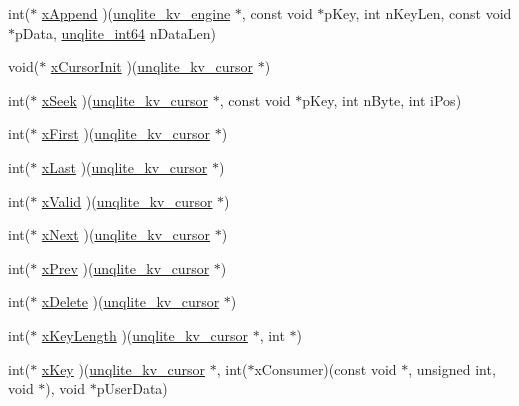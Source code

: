 \begin{DoxyCompactItemize}
\item 
int($\ast$ \hyperlink{structunqlite__kv__methods_a84b482400e3dee633d777cca654b6aec}{x\-Append} )(\hyperlink{structunqlite__kv__engine}{unqlite\-\_\-kv\-\_\-engine} $\ast$, const void $\ast$p\-Key, int n\-Key\-Len, const void $\ast$p\-Data, \hyperlink{unqlite_8c_ae7dd2792142c2ec7874a56602b8f2bb8}{unqlite\-\_\-int64} n\-Data\-Len)
\item 
void($\ast$ \hyperlink{structunqlite__kv__methods_a89a88a0ec7164b2529d282a8ae1bbd21}{x\-Cursor\-Init} )(\hyperlink{structunqlite__kv__cursor}{unqlite\-\_\-kv\-\_\-cursor} $\ast$)
\item 
int($\ast$ \hyperlink{structunqlite__kv__methods_a56a566a04004c87f270a12b316deb087}{x\-Seek} )(\hyperlink{structunqlite__kv__cursor}{unqlite\-\_\-kv\-\_\-cursor} $\ast$, const void $\ast$p\-Key, int n\-Byte, int i\-Pos)
\item 
int($\ast$ \hyperlink{structunqlite__kv__methods_a18e040ebb42c50ced03d545d48b98c72}{x\-First} )(\hyperlink{structunqlite__kv__cursor}{unqlite\-\_\-kv\-\_\-cursor} $\ast$)
\item 
int($\ast$ \hyperlink{structunqlite__kv__methods_a4cf12f1965c2442575cb226397c3545c}{x\-Last} )(\hyperlink{structunqlite__kv__cursor}{unqlite\-\_\-kv\-\_\-cursor} $\ast$)
\item 
int($\ast$ \hyperlink{structunqlite__kv__methods_a766810f47c6450157b01398f0d76f910}{x\-Valid} )(\hyperlink{structunqlite__kv__cursor}{unqlite\-\_\-kv\-\_\-cursor} $\ast$)
\item 
int($\ast$ \hyperlink{structunqlite__kv__methods_ae177efc5e24a54891754ef2994786228}{x\-Next} )(\hyperlink{structunqlite__kv__cursor}{unqlite\-\_\-kv\-\_\-cursor} $\ast$)
\item 
int($\ast$ \hyperlink{structunqlite__kv__methods_ae16eea9a25dc889523a9a0729cb86def}{x\-Prev} )(\hyperlink{structunqlite__kv__cursor}{unqlite\-\_\-kv\-\_\-cursor} $\ast$)
\item 
int($\ast$ \hyperlink{structunqlite__kv__methods_a83aa7b58b08550a4814b4184eddb8d3c}{x\-Delete} )(\hyperlink{structunqlite__kv__cursor}{unqlite\-\_\-kv\-\_\-cursor} $\ast$)
\item 
int($\ast$ \hyperlink{structunqlite__kv__methods_ae280fe876217defc8fcdfc6c260c9620}{x\-Key\-Length} )(\hyperlink{structunqlite__kv__cursor}{unqlite\-\_\-kv\-\_\-cursor} $\ast$, int $\ast$)
\item 
int($\ast$ \hyperlink{structunqlite__kv__methods_a3c35e9e3f75ba182847c7757164b3df1}{x\-Key} )(\hyperlink{structunqlite__kv__cursor}{unqlite\-\_\-kv\-\_\-cursor} $\ast$, int($\ast$x\-Consumer)(const void $\ast$, unsigned int, void $\ast$), void $\ast$p\-User\-Data)

\end{DoxyCompactItemize}
